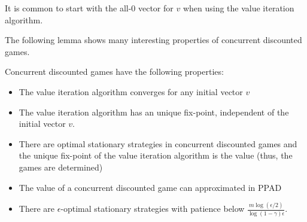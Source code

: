It is common to start with the all-0 vector for $v$ when using the value iteration algorithm.

The following lemma shows many interesting properties of concurrent discounted games.






\begin{lemma}\label{cor:long}
Concurrent discounted games have the following properties:
\begin{itemize}
\item The value iteration algorithm converges for any initial vector $v$
\item The value iteration algorithm has an unique fix-point, independent of the initial vector $v$.
\item There are optimal stationary strategies in concurrent discounted games and the unique fix-point of the value iteration algorithm is the value (thus, the games are determined)
\item The value of a concurrent discounted game can approximated in PPAD
\item There are $\epsilon$-optimal stationary strategies with patience below $\frac{m\log(\epsilon/2)}{\log(1-\gamma)\epsilon}$.
\end{itemize}
\end{lemma}
